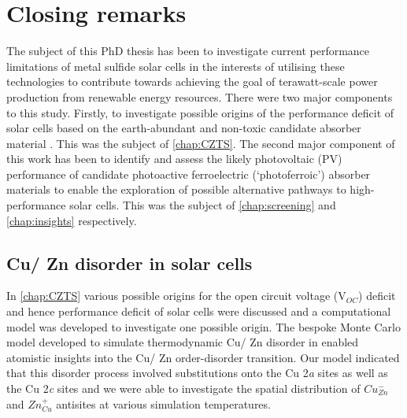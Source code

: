 \documentclass[11pt, twoside]{report}
\begin{document}







\chapter{Closing remarks}
The subject of this PhD thesis has been to investigate current performance limitations of metal sulfide solar cells in the interests of utilising these technologies to contribute towards achieving the goal of terawatt-scale power production from renewable energy resources. There were two major components to this study. Firstly, to investigate possible origins of the performance deficit of solar cells based on the earth-abundant and non-toxic candidate absorber material {\CZTS}. This was the subject of \autoref{chap:CZTS}. The second major component of this work has been to identify and assess the likely photovoltaic (PV) performance of candidate photoactive ferroelectric (`photoferroic') absorber materials to enable the exploration of possible alternative pathways to high-performance solar cells. This was the subject of \autoref{chap:screening} and \autoref{chap:insights} respectively.

\section{Cu/ Zn disorder in {\CZTS} solar cells}
In \autoref{chap:CZTS} various possible origins for the open circuit voltage (V$_{OC}$) deficit and hence performance deficit of {\CZTS} solar cells were discussed and a computational model was developed to investigate one possible origin. The bespoke Monte Carlo model developed to simulate thermodynamic Cu/ Zn disorder in {\CZTS} enabled atomistic insights into the Cu/ Zn order-disorder transition. Our model indicated that this disorder process involved substitutions onto the Cu 2\textit{a} sites as well as the Cu 2\textit{c} sites and we were able to investigate the spatial distribution of $Cu_{Zn}^{-}$ and $Zn_{Cu}^{+}$ antisites at various simulation temperatures.
\end{document}
